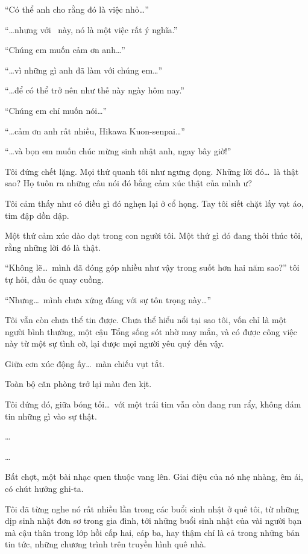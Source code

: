 \documentclass[../main.tex]{subfiles}
\begin{document}
``Có thể anh cho rằng đó là việc nhỏ\dots''

``\dots nhưng với \hll\ này, nó là một việc rất ý nghĩa.''

``Chúng em muốn cảm ơn anh\dots''

``\dots vì những gì anh đã làm với chúng em\dots''

``\dots để có thể trở nên như thế này ngày hôm nay.''

``Chúng em chỉ muốn nói\dots''

``\dots cảm ơn anh rất nhiều, Hikawa Kuon-senpai\dots''

``\dots và bọn em muốn chúc mừng sinh nhật anh, ngay bây giờ!''

\il

Tôi đứng chết lặng. Mọi thứ quanh tôi như ngưng đọng. Những lời đó\dots\ là thật sao? Họ tuôn ra những câu nói đó bằng cảm xúc thật của mình ư?

Tôi cảm thấy như có điều gì đó nghẹn lại ở cổ họng. Tay tôi siết chặt lấy vạt áo, tim đập dồn dập.

Một thứ cảm xúc dào dạt trong con người tôi. Một thứ gì đó đang thôi thúc tôi, rằng những lời đó là thật.

``Không lẽ\dots\ mình đã đóng góp nhiều như vậy trong suốt hơn hai năm sao?'' tôi tự hỏi, đầu óc quay cuồng.

``Nhưng\dots\ mình chưa xứng đáng với sự tôn trọng này\dots''

Tôi vẫn còn chưa thể tin được. Chưa thể hiểu nổi tại sao tôi, vốn chỉ là một người bình thường, một cậu Tổng sống sót nhờ may mắn, và có được công việc này từ một sự tình cờ, lại được mọi người yêu quý đến vậy.

Giữa cơn xúc động ấy\dots\ màn chiếu vụt tắt.

Toàn bộ căn phòng trở lại màu đen kịt.

Tôi đứng đó, giữa bóng tối\dots\ với một trái tim vẫn còn đang run rẩy, không dám tin những gì vào sự thật.

\dots

\dots

Bất chợt, một bài nhạc quen thuộc vang lên. Giai điệu của nó nhẹ nhàng, êm ái, có chút hưởng ghi-ta.

Tôi đã từng nghe nó rất nhiều lần trong các buổi sinh nhật ở quê tôi, từ những dịp sinh nhật đơn sơ trong gia đình, tới những buổi sinh nhật của vài người bạn mà cậu thân trong lớp hồi cấp hai, cáp ba, hay thậm chí là cả trong những bản tin tức, những chương trình trên truyền hình quê nhà.
\end{document}
